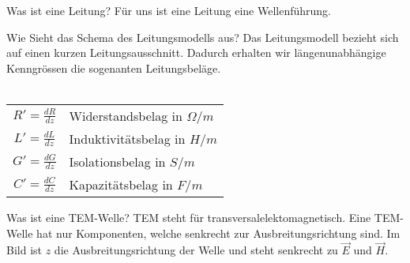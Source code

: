 
\begin{karte}{Was ist eine Leitung?}
	Für uns ist eine Leitung eine Wellenführung.\\
\end{karte}

\begin{karte}{Wie Sieht das Schema des Leitungsmodells aus?}
	Das Leitungsmodell bezieht sich auf einen kurzen Leitungsausschnitt. Dadurch erhalten wir längenunabhängige Kenngrössen die sogenanten Leitungsbeläge.\\
		\scalebox{.49}{}\\[5pt]
	\tiny
	\renewcommand\arraystretch{1.7}
	\begin{tabular}{cl}
		$R'=\frac{dR}{dz}$ & Widerstandsbelag in $\Omega/m$\\
		$L'=\frac{dL}{dz}$ & Induktivitätsbelag in $H/m$\\
		$G'=\frac{dG}{dz}$ & Isolationsbelag in $S/m$\\
		$C'=\frac{dC}{dz}$ & Kapazitätsbelag in $F/m$\\
	\end{tabular}
	\normalsize


\end{karte}

\begin{karte}{Was ist eine TEM-Welle?}
	TEM steht für transversalelektomagnetisch. Eine TEM-Welle hat nur Komponenten, welche senkrecht zur Ausbreitungsrichtung sind. Im Bild ist $z$ die Ausbreitungsrichtung der Welle und steht senkrecht zu $\vec{E}$ und $\vec{H}$. \\[10pt]
	
\end{karte}

